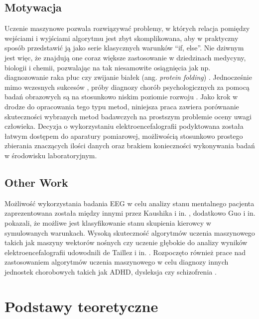 \documentclass{./assets/wfis}
\begin{document}
\section{Motywacja}
Uczenie maszynowe pozwala rozwiązywać problemy, w których relacja pomiędzy wejściami i wyjściami algorytmu jest zbyt skomplikowana, aby w praktyczny sposób przedstawić ją jako serie klasycznych warunków “if, else”. Nie dziwnym jest więc, że znajdują one coraz większe zastosowanie w dziedzinach medycyny, biologii i chemii, pozwalając na tak niesamowite osiągnięcia jak np. diagnozowanie raka płuc \cite{li_machine_2022} czy zwijanie białek (ang. \textit{protein folding}) \cite{jumper_highly_2021}. Jednocześnie mimo wczesnych sukcesów \cite{some comparasion}, próby diagnozy chorób psychologicznych za pomocą badań obrazowych są na stosunkowo niskim poziomie rozwoju \cite{badania adhd i podobne}. Jako krok w drodze do opracowania tego typu metod, niniejsza praca zawiera porównanie skuteczności wybranych metod badawczych na prostszym problemie oceny uwagi człowieka. Decyzja o wykorzystaniu elektroencefalografii podyktowana została łatwym dostępem do aparatury pomiarowej, możliwością stosunkowo prostego zbierania znaczących ilości danych oraz brakiem konieczności wykonywania badań w środowisku laboratoryjnym.

\section{Other Work}
Możliwość wykorzystania badania EEG w celu analizy stanu mentalnego pacjenta zaprezentowana została między innymi przez Kaushika i in. \cite{kaushik_decoding_2022}, dodatkowo Guo i in. \cite{guo_detection_2018} pokazali, że możliwe jest klasyfikowanie stanu skupienia kierowcy w symulowanych warunkach. Wysoką skuteczność algorytmów uczenia maszynowego takich jak maszyny wektorów nośnych czy uczenie głębokie do analizy wyników elektroencefalografii udowodnili de Taillez i in. \cite{de_taillez_machine_2020}. Rozpoczęto również prace nad zastosowaniem algorytmów uczenia maszynowego w celu diagnozy innych jednostek chorobowych takich jak ADHD, dysleksja czy schizofrenia \cite{ahire_comprehensive_2022, joshi_review_2021, clarke_eeg_2002}.


\chapter{Podstawy teoretyczne}
\end{document}
